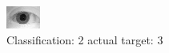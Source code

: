 \begin{figure}[h!]
\begin{center}
\includegraphics[width=0.60\columnwidth]{figures/ID1071_class_2_target_3.png}
\end{center}
\caption{ Classification: 2 actual target: 3}
\label{fig:ID1071_class_2_target_3}
\end{figure}

